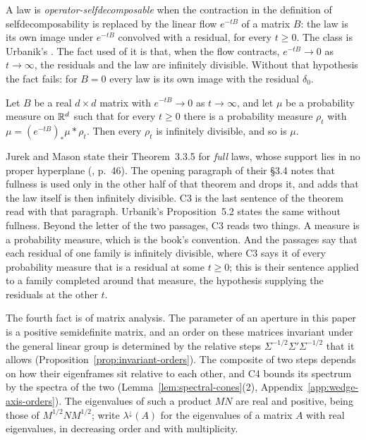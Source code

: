 A law is \emph{operator-self\-de\-com\-pos\-able} when the contraction in the definition of
self\-de\-com\-pos\-abil\-ity is replaced by the linear flow $e^{-tB}$ of a matrix $B$: the law is its own
image under $e^{-tB}$ convolved with a residual, for every $t \ge 0$. The class is Urbanik's
. The fact used of it is that, when the flow contracts, $e^{-tB} \to 0$ as
$t \to \infty$, the residuals and the law are infinitely divisible. Without that hypothesis the fact
fails: for $B = 0$ every law is its own image with the residual $\delta_0$.

\begin{theorem}\label{thm:cited-A5}
Let $B$ be a real $d \times d$ matrix with $e^{-tB} \to 0$ as $t \to \infty$, and let $\mu$ be a
probability measure on $\mathbb{R}^d$ such that for every $t \ge 0$ there is a probability measure
$\rho_t$ with $\mu = (e^{-tB})_*\mu * \rho_t$. Then every $\rho_t$ is infinitely divisible, and so
is $\mu$.
\end{theorem}

Jurek and Mason state their Theorem~3.3.5 for \emph{full} laws, whose support lies in no proper
hyperplane (, p.~46). The opening paragraph of their \S3.4 notes that fullness is used only in the other half of
that theorem and drops it, and adds that the law itself is then infinitely divisible. C3 is the last
sentence of the theorem read with that paragraph. Urbanik's Proposition~5.2 states the same without
fullness. Beyond the letter of the two passages, C3 reads two things. A measure is a probability
measure, which is the book's convention. And the passages say that each residual of one family is
infinitely divisible, where C3 says it of every probability measure that is a residual at some
$t \ge 0$; this is their sentence applied to a family completed around that measure, the hypothesis
supplying the residuals at the other $t$.

The fourth fact is of matrix analysis. The parameter of an aperture in this paper is a positive
semidefinite matrix, and an order on these matrices invariant under the general linear group is determined by the relative steps
$\Sigma^{-1/2}\Sigma'\Sigma^{-1/2}$ that it allows (Proposition~\ref{prop:invariant-orders}). The
composite of two steps depends on how their eigenframes sit relative to each other, and C4 bounds
its spectrum by the spectra of the two (Lemma~\ref{lem:spectral-cones}(2),
Appendix~\ref{app:wedge-axis-orders}).
The eigenvalues of such a product $MN$ are real and positive, being those of $M^{1/2}NM^{1/2}$; write
$\lambda^\downarrow(A)$ for the eigenvalues of a matrix $A$ with real eigenvalues, in decreasing order and
with multiplicity.

